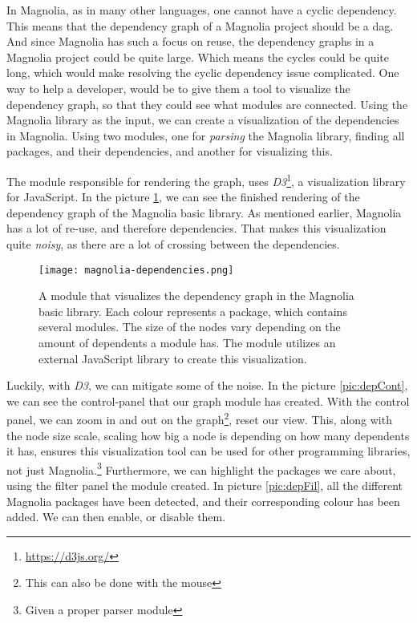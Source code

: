 In Magnolia, as in many other languages, one cannot have a cyclic dependency.
This means that the dependency graph of a Magnolia project should be a
\gls*{dag}. And since Magnolia has such a focus on reuse, the dependency graphs
in a Magnolia project could be quite large. Which means the cycles could be
quite long, which would make resolving the cyclic dependency issue complicated.
One way to help a developer, would be to give them a tool to visualize the
dependency graph, so that they could see what modules are connected. Using the
Magnolia library as the input, we can create a visualization of the dependencies
in Magnolia. Using two modules, one for \textit{parsing} the Magnolia library,
finding all packages, and their dependencies, and another for visualizing
this.

The module responsible for rendering the graph, uses
\textit{D3}\footnote{\url{https://d3js.org/}}, a visualization library for
JavaScript. In the picture \ref{pic:magLib}, we can see the finished rendering
of the dependency graph of the Magnolia basic library. As mentioned earlier,
Magnolia has a lot of re-use, and therefore dependencies. That makes this
visualization quite \textit{noisy}, as there are a lot of crossing between the
dependencies.

\begin{figure}[H]
  \centering
  \texttt{[image: magnolia-dependencies.png]}
  \caption{
    A module that visualizes the dependency graph in the Magnolia basic library.
    Each colour represents a package, which contains several modules. The size
    of the nodes vary depending on the amount of dependents a module has. The
    module utilizes an external JavaScript library to create this visualization.
  }
  \label{pic:magLib}
\end{figure}

Luckily, with \textit{D3}, we can mitigate some of the noise. In the picture
\ref{pic:depCont}, we can see the control-panel that our graph module has
created. With the control panel, we can zoom in and out on the graph\footnote{This can also be done with the mouse},
reset our view. This, along with the node size scale, scaling how big
a node is depending on how many dependents it has, ensures this visualization
tool can be used for other programming libraries, not just Magnolia.\footnote{Given a proper parser module}
Furthermore, we can highlight the packages we care about, using the filter
panel the module created. In picture \ref{pic:depFil}, all the different
Magnolia packages have been detected, and their corresponding colour has been
added. We can then enable, or disable them.

